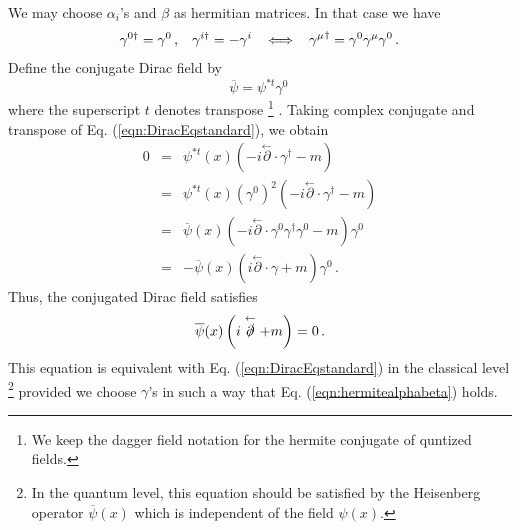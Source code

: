We may choose $\alpha_i$'s and $\beta$ as hermitian matrices.
In that case we have
\begin{eqnarray}
\gamma^{0\dagger} = \gamma^0\,,
\hspace{3mm}
\gamma^{i\dagger} = - \gamma^i
\hspace{3mm}
\Longleftrightarrow
\hspace{3mm}
{\gamma^\mu}^\dagger = \gamma^0 \gamma^\mu \gamma^0 \,.
\label{eqn:hermitealphabeta}
\end{eqnarray}
Define the conjugate Dirac field by
\begin{equation}
\overline{\psi} = \psi^{*t} \gamma^0\,
\label{eqn:DefConjDiracField}
\end{equation}
where the superscript $t$ denotes transpose
\footnote{%
We keep the dagger field notation
for the hermite conjugate of quntized fields.
}%
.
Taking complex conjugate and transpose of Eq. (\ref{eqn:DiracEqstandard}), we obtain
\begin{eqnarray}
0 &=&  
\psi^{*t}(x) 
\left( -i \stackrel{\leftarrow}{\partial} \cdot \gamma^\dagger - m \right) 
\nonumber\\
&=&
\psi^{*t}(x) (\gamma^0)^2
\left( -i \stackrel{\leftarrow}{\partial} \cdot \gamma^\dagger - m \right) 
\nonumber\\
&=&
\overline{\psi}(x)
\left( -i \stackrel{\leftarrow}{\partial} \cdot \gamma^0\gamma^\dagger \gamma^0 - m \right) \gamma^0
\nonumber\\
&=&
- \overline{\psi}(x)
\left( i \stackrel{\leftarrow}{\partial} \cdot \gamma  + m \right) \gamma^0 \,.
\nonumber
\end{eqnarray}
Thus, the conjugated Dirac field satisfies
\begin{eqnarray}
\overline{\psi}(x)
\left( i \stackrel{\leftarrow}{\slashed{\partial}}  + m \right)
= 0 \,.
\label{eqn:DiracEqBarstandard}
\end{eqnarray}
This equation is equivalent with Eq. (\ref{eqn:DiracEqstandard}) in the classical level
\footnote{%
In the quantum level, this equation should be satisfied by the Heisenberg operator 
$\overline{\psi}(x)$ which is independent of the field ${\psi}(x)$.
}%
provided we choose $\gamma$'s in such a way that Eq. (\ref{eqn:hermitealphabeta}) holds.
\bigskip 

